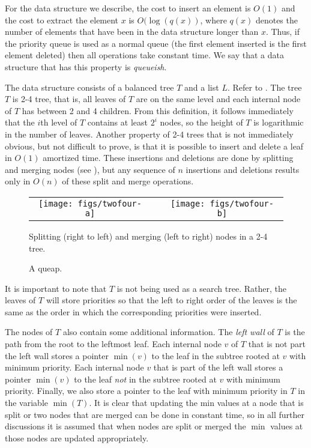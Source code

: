{For the data structure we describe, the cost to insert an element is
$O(1)$ and the cost to extract the element $x$ is $O(\log(q(x))$,
where $q(x)$ denotes the number of elements that have been in the data
structure longer than $x$.  Thus, if the priority queue is used as a
normal queue (the first element inserted is the first element deleted)
then all operations take constant time.  We say that a data structure
that has this property is \emph{queueish}.

The data structure consists of a balanced tree $T$ and a list $L$.
Refer to . The tree $T$ is 2-4 tree, that is, all leaves
of $T$ are on the same level and each internal node of $T$ has between
2 and 4 children.  From this definition, it follows immediately that
the $i$th level of $T$ contains at least $2^i$ nodes, so the height of
$T$ is logarithmic in the number of leaves.  Another property of 2-4
trees that is not immediately obvious, but not difficult to prove, is
that it is possible to insert and delete a leaf in $O(1)$ amortized
time.  These insertions and deletions are done by splitting and
merging nodes (see
), but any sequence of $n$ insertions and deletions
results only in $O(n)$ of these split and merge operations.

\begin{figure}
\begin{center}\begin{tabular}{ccc}
\texttt{[image: figs/twofour-a]} & \raisebox{.6cm}{$\Leftrightarrow$} & \texttt{[image: figs/twofour-b]}
\end{tabular}\end{center}
\caption{Splitting (right to left) and merging (left to right) nodes in a 2-4 tree.}
\end{figure}

\begin{figure}
\caption{A queap.}
\end{figure}

It is important to note that $T$ is not being used as a search tree.
Rather, the leaves of $T$ will store priorities so that the left to
right order of the leaves is the same as the order in which the
corresponding priorities were inserted.

The nodes of $T$ also contain some additional information.  The
\emph{left wall} of $T$ is the path from the root to the leftmost leaf.
Each internal node $v$ of $T$ that is not part the left wall stores a
pointer $\min(v)$ to the leaf in the subtree rooted at $v$ with
minimum priority.  Each internal node $v$ that is part of the left
wall stores a pointer $\min(v)$ to the leaf \emph{not} in the subtree
rooted at $v$ with minimum priority.  Finally, we also store a pointer
to the leaf with minimum priority in $T$ in the variable $\min(T)$.
It is clear that updating the min values at a node that is split or
two nodes that are merged can be done in constant time, so in all
further discussions it is assumed that when nodes are split or merged
the $\min$ values at those nodes are updated appropriately.

}

